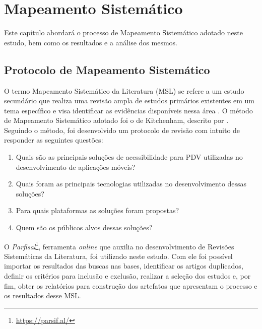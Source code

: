 \chapter{Mapeamento Sistemático}
\label{ch:mapping}

Este capítulo abordará o processo de Mapeamento Sistemático adotado neste estudo, bem como os resultados e a análise dos mesmos.

\section{Protocolo de Mapeamento Sistemático}
O termo Mapeamento Sistemático da Literatura (MSL) se refere a um estudo secundário que realiza uma revisão ampla
de estudos primários existentes em um tema específico e visa identificar as evidências disponíveis nessa área \cite{Kitchenham2007}.
O método de Mapeamento Sistemático adotado foi o de Kitchenham, descrito por .
Seguindo o método, foi desenvolvido um protocolo de revisão com intuito de responder as seguintes questões:
\begin{enumerate}
  \item Quais são as principais soluções de acessibilidade para PDV utilizadas no desenvolvimento de aplicações móveis?
  \item Quais foram as principais tecnologias utilizadas no desenvolvimento dessas soluções?
  \item Para quais plataformas as soluções foram propostas?
  \item Quem são os públicos alvos dessas soluções?
\end{enumerate}

O \emph{Parfisal}\footnote{\url{https://parsif.al/}}, ferramenta \emph{online} que auxilia no desenvolvimento de Revisões Sistemáticas da Literatura, foi utilizado neste estudo.
Com ele foi possível importar os resultados das buscas nas bases, identificar os artigos duplicados, definir os critérios para inclusão e exclusão, realizar a seleção dos estudos e, por fim, obter os relatórios para construção dos artefatos que apresentam o processo e os resultados desse MSL.

